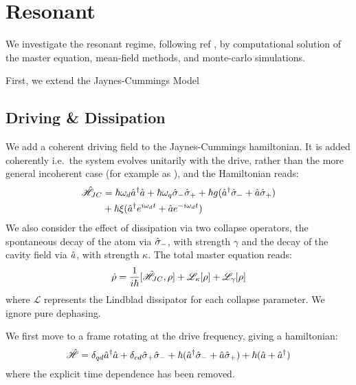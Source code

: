\section{Resonant}
We investigate the resonant regime, following ref \cite{Carmichael2015}, by computational solution of the master equation, mean-field methods, and monte-carlo simulations.

First, we extend the Jaynes-Cummings Model

\subsection{Driving \& Dissipation}
We add a coherent driving field to the Jaynes-Cummings hamiltonian. It is added coherently i.e.\ the system evolves unitarily with the drive, rather than the more general incoherent case (for example as \cite{Xu2014}), and the Hamiltonian reads:
\begin{align}
    \hat{\mathscr{H}}_{JC} &= \hbar \omega_d \hat{a}^\dagger \hat{a} + \hbar \omega_q \hat{\sigma}_- \hat{\sigma}_+ +\hbar g (\hat{a}^\dagger \hat{\sigma}_-+ \hat{a} \hat{\sigma}_+)\\
    & + \hbar \xi (\hat{a}^\dagger e^{i\omega_d t} + \hat{a} e^{-i\omega_d t})
\end{align}
We also consider the effect of dissipation via two collapse operators, the spontaneous decay of the atom via $\hat{\sigma}_-$, with strength $\gamma$ and the decay of the cavity field via $\hat{a}$, with strength $\kappa$. The total master equation reads:
\begin{equation}
  \dot{\rho} = \frac{1}{i\hbar}[\hat{\mathscr{H}}_{JC}, \rho] + \mathscr{L}_\kappa[\rho] + \mathscr{L}_\gamma[\rho]
\end{equation}
where $\mathscr{L}$ represents the Lindblad dissipator for each collapse parameter. 
We ignore pure dephasing.

We first move to a frame rotating at the drive frequency, giving a hamiltonian:
\begin{equation}
  \hat{\mathscr{H}} = \delta_{qd} \hat{a}^\dagger \hat{a} + \delta_{cd} \hat{\sigma}_+ \hat{\sigma}_- + \hbar (\hat{a}^\dagger \hat{\sigma}_- + \hat{a} \hat{\sigma}_+) + \hbar (\hat{a} + \hat{a}^\dagger)
\end{equation}
where the explicit time dependence has been removed.
